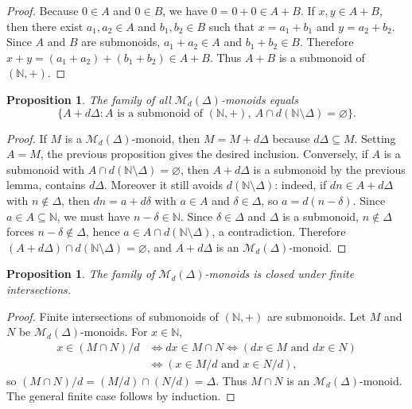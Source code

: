 \documentclass[12pt,a4paper]{amsart}
\newtheorem{proposition}[theorem]{Proposition}
\theoremstyle{definition}
\theoremstyle{remark}
\begin{document}
\begin{proof}
Because $0\in A$ and $0\in B$, we have $0=0+0\in A+B$. If $x,y\in A+B$, then there exist
$a_1,a_2\in A$ and $b_1,b_2\in B$ such that $x=a_1+b_1$ and $y=a_2+b_2$. Since $A$ and $B$ are submonoids,
$a_1+a_2\in A$ and $b_1+b_2\in B$. Therefore $x+y=(a_1+a_2)+(b_1+b_2)\in A+B$.
Thus $A+B$ is a submonoid of $(\mathbb{N},+)$.
\end{proof}

\begin{proposition}\label{prop:2.5}
The family of all $\mathcal{M}_d(\Delta)$-monoids equals
\[
\{A+d\Delta : A \text{ is a submonoid of } (\mathbb{N},+),\ A\cap d(\mathbb{N}\setminus \Delta)=\varnothing\}.
\]
\end{proposition}

\begin{proof}
If $M$ is a $\mathcal{M}_d(\Delta)$-monoid, then $M=M+d\Delta$ because $d\Delta\subseteq M$. Setting
$A=M$, the previous proposition gives the desired inclusion. Conversely, if $A$ is a submonoid with
$A\cap d(\mathbb{N}\setminus \Delta)=\varnothing$, then $A+d\Delta$ is a submonoid by the previous lemma,
contains $d\Delta$. Moreover it still avoids $d(\mathbb{N}\setminus \Delta)$: indeed, if $dn\in A+d\Delta$ with $n\notin\Delta$, then
$dn=a+d\delta$ with $a\in A$ and $\delta\in\Delta$, so $a=d(n-\delta)$. Since $a\in A\subseteq\mathbb{N}$, we must have $n-\delta\in\mathbb{N}$. Since $\delta\in\Delta$ and $\Delta$ is a submonoid, $n\notin\Delta$ forces $n-\delta\notin\Delta$, hence $a\in A\cap d(\mathbb{N}\setminus\Delta)$, a contradiction. Therefore
$(A+d\Delta)\cap d(\mathbb{N}\setminus\Delta)=\varnothing$, and $A+d\Delta$ is an $\mathcal{M}_d(\Delta)$-monoid.
\end{proof}

\begin{proposition}\label{prop:2.6}
The family of $\mathcal{M}_d(\Delta)$-monoids is closed under finite intersections.
\end{proposition}

\begin{proof}
Finite intersections of submonoids of $(\mathbb{N},+)$ are submonoids. Let $M$ and $N$ be $\mathcal{M}_d(\Delta)$-monoids. For $x\in\mathbb{N}$,
\begin{align*}
 x\in (M\cap N)/d & \iff dx\in M\cap N  \iff (dx\in M \text{ and } dx\in N) \\ & \iff (x\in M/d \text{ and } x\in N/d),  
\end{align*}
so $(M\cap N)/d=(M/d)\cap(N/d)=\Delta$. Thus $M\cap N$ is an $\mathcal{M}_d(\Delta)$-monoid. The general finite case follows by induction.
\end{proof}
\end{document}
